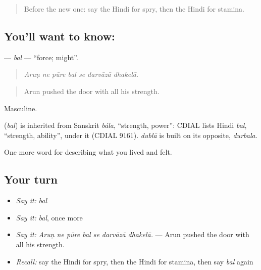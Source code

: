 \begin{quote}
Before the new one: say the Hindi for spry, then the Hindi for stamina.
\end{quote}

\subsection*{You'll want to know: }
\textbf{} — \emph{bal} — \textquotedblleft{}force; might\textquotedblright{}.

\begin{quote}
      
\end{quote}

\begin{quote}
\emph{Aruṇ ne pūre bal se darvāzā dhakelā.}
\end{quote}

\begin{quote}
Arun pushed the door with all his strength.
\end{quote}

Masculine.

\begin{cousinweb}
\textbf{} (\emph{bal}) is inherited from Sanskrit \emph{bála}, \textquotedblleft{}strength, power\textquotedblright{}: CDIAL lists Hindi \emph{bal}, \textquotedblleft{}strength, ability\textquotedblright{}, under it (CDIAL 9161). \emph{dublā} is built on its opposite, \emph{durbala}.
\end{cousinweb}

\begin{grammarlens}[title={What you've built}]
One more word for describing what you lived and felt.
\end{grammarlens}

\subsection*{Your turn}
\begin{itemize}
\raggedright
  \item \emph{Say it:} \emph{bal}
  \item \emph{Say it:} \emph{bal}, once more
  \item \emph{Say it:} \emph{Aruṇ ne pūre bal se darvāzā dhakelā.} — Arun pushed the door with all his strength.
  \item \emph{Recall:} say the Hindi for spry, then the Hindi for stamina, then say \emph{bal} again
\end{itemize}

